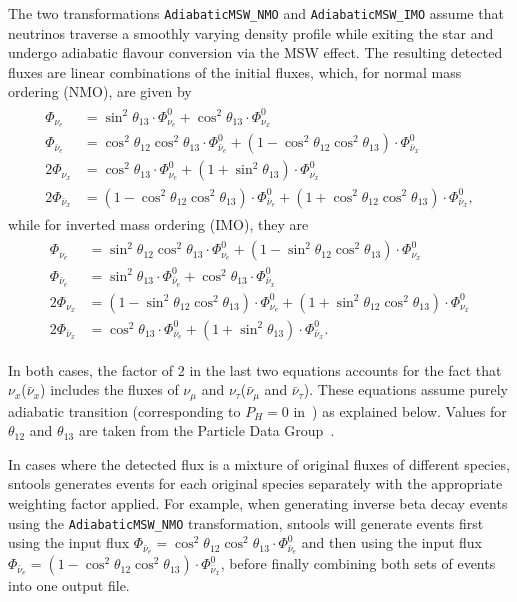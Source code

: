 \documentclass[11pt, oneside]{article}
\newcommand{\nue}{\ensuremath{\nu_e}\xspace}
\newcommand{\numu}{\ensuremath{\nu_\mu}\xspace}
\newcommand{\nutau}{\ensuremath{\nu_\tau}\xspace}
\newcommand{\nux}{\ensuremath{\nu_x}\xspace}
\newcommand{\nuebar}{\ensuremath{\bar{\nu}_e}\xspace}
\newcommand{\numubar}{\ensuremath{\bar{\nu}_\mu}\xspace}
\newcommand{\nutaubar}{\ensuremath{\bar{\nu}_\tau}\xspace}
\newcommand{\nuxbar}{\ensuremath{\bar{\nu}_x}\xspace}
\begin{document}
The two transformations \texttt{AdiabaticMSW\_NMO} and \texttt{AdiabaticMSW\_IMO} assume that neutrinos traverse a smoothly varying density profile while exiting the star and undergo adiabatic flavour conversion via the MSW effect.
The resulting detected fluxes are linear combinations of the initial fluxes, which, for normal mass ordering (NMO), are given by~\cite{Dighe2000}
\begin{align}
\begin{split}
\Phi_{\nue} &= \sin^2 \theta_{13} \cdot \Phi_{\nue}^0 + \cos^2 \theta_{13} \cdot \Phi_{\nux}^0\\
\Phi_{\nuebar} &= \cos^2 \theta_{12} \cos^2 \theta_{13} \cdot \Phi^0_{\nuebar} + (1 - \cos^2 \theta_{12} \cos^2 \theta_{13}) \cdot \Phi^0_{\nuxbar} \\
2 \Phi_{\nux} &= \cos^2 \theta_{13} \cdot \Phi^0_{\nue} + (1 + \sin^2 \theta_{13}) \cdot \Phi^0_{\nux} \\
2 \Phi_{\nuxbar} &= (1 - \cos^2 \theta_{12} \cos^2 \theta_{13}) \cdot \Phi^0_{\nuebar} + (1 + \cos^2 \theta_{12} \cos^2 \theta_{13}) \cdot \Phi^0_{\nuxbar},
\end{split}
\end{align}
while for inverted mass ordering (IMO), they are
\begin{align}
\begin{split}
\Phi_{\nue} &= \sin^2 \theta_{12} \cos^2 \theta_{13} \cdot \Phi_{\nue}^0 + (1 - \sin^2 \theta_{12} \cos^2 \theta_{13}) \cdot \Phi_{\nux}^0\\
\Phi_{\nuebar} &= \sin^2 \theta_{13} \cdot \Phi_{\nuebar}^0 + \cos^2 \theta_{13} \cdot \Phi_{\nuxbar}^0\\
2 \Phi_{\nux} &= (1 - \sin^2 \theta_{12} \cos^2 \theta_{13}) \cdot \Phi_{\nue}^0 + (1 + \sin^2 \theta_{12} \cos^2 \theta_{13}) \cdot \Phi_{\nux}^0\\
2 \Phi_{\nuxbar} &= \cos^2 \theta_{13} \cdot \Phi_{\nuebar}^0 + (1 + \sin^2 \theta_{13}) \cdot \Phi^0_{\nuxbar}.
\end{split}
\end{align}

In both cases, the factor of 2 in the last two equations accounts for the fact that \nux (\nuxbar) includes the fluxes of \numu and \nutau (\numubar and \nutaubar).
These equations assume purely adiabatic transition (corresponding to $P_H = 0$ in~\cite{Dighe2000,Fogli2005}) as explained below.
Values for $\theta_{12}$ and $\theta_{13}$ are taken from the Particle Data Group~\cite{PDG2020}.

In cases where the detected flux is a mixture of original fluxes of different species, sntools generates events for each original species separately with the appropriate weighting factor applied.
For example, when generating inverse beta decay events using the \texttt{AdiabaticMSW\_NMO} transformation, sntools will generate events first using the input flux $\Phi_{\nuebar} = \cos^2 \theta_{12} \cos^2 \theta_{13} \cdot \Phi^0_{\nuebar}$ and then using the input flux $\Phi_{\nuebar} = (1 - \cos^2 \theta_{12} \cos^2 \theta_{13}) \cdot \Phi^0_{\nuxbar}$, before finally combining both sets of events into one output file.
\end{document}
